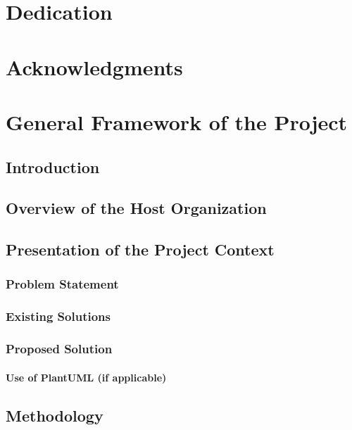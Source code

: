 \documentclass[a4paper,12pt]{report}
\begin{document}
\newpage
\thispagestyle{empty}
\mbox{}
\newpage

\chapter*{Dedication}
\newpage

\chapter*{Acknowledgments}
\newpage

\tableofcontents
\newpage

\listoffigures
\newpage

\listoftables
\newpage

\chapter{General Framework of the Project}

\minitoc
\section{Introduction}
\section{Overview of the Host Organization}
\section{Presentation of the Project Context}
\subsection{Problem Statement}
\subsection{Existing Solutions}
\subsection{Proposed Solution}
\subsubsection{Use of PlantUML (if applicable)}
\section{Methodology}
\end{document}
